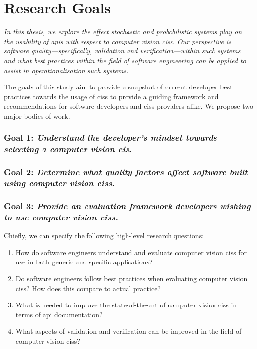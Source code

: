 \section{Research Goals}

\itshape
In this thesis, we explore the effect stochastic and probabilistic systems play on the usability of \glspl{api} with respect to computer vision \glspl{cis}. Our perspective is software quality---specifically, validation and verification---within such systems and what best practices within the field of software engineering can be applied to assist in operationalisation such systems.
\upshape

The goals of this study aim to provide a snapshot of current developer best practices towards the usage of \glspl{cis} to provide a guiding framework and recommendations for software developers and \glspl{cis} providers alike. We propose two major bodies of work.

\subsubsection*{Goal 1: \textit{Understand the developer's mindset towards selecting a computer vision \gls{cis}}.}

\subsubsection*{Goal 2: \textit{Determine what quality factors affect software built using computer vision \glspl{cis}}.}

\subsubsection*{Goal 3: \textit{Provide an evaluation framework developers wishing to use computer vision \glspl{cis}.}}

Chiefly, we can specify the following high-level research questions:

\begin{enumerate}[label=\textbf{RQ\arabic*}., leftmargin=4\parindent]
  \item How do software engineers understand and evaluate computer vision \glspl{cis} for use in both generic and specific applications?
  \item Do software engineers follow best practices when evaluating computer vision \glspl{cis}? How does this compare to actual practice?
  \item What is needed to improve the state-of-the-art of computer vision \glspl{cis} in terms of \gls{api} documentation?
  \item What aspects of validation and verification can be improved in the field of computer vision \glspl{cis}?
\end{enumerate}

